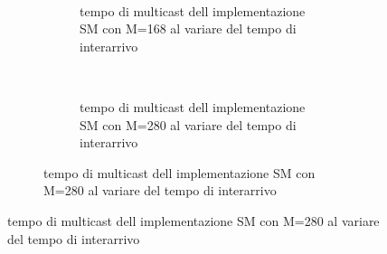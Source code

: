 \begin{figure}[p]
\begin{subfigure}[b]{.5\columnwidth}
\begin{subfigure}[b]{\textwidth}
    \end{subfigure}
    ~
    \begin{subfigure}[b]{\textwidth}
      \centering
      \addtocounter{subfigure}{-1}
      \renewcommand\thesubfigure{\alph{subfigure}2}
      \resizebox{\columnwidth}{!}{}
      \caption{tempo di multicast dell implementazione SM con M=168 al variare del tempo di interarrivo}
      \label{fig:scalability_SM_size168}
    \end{subfigure}
    ~
    \begin{subfigure}[b]{\textwidth}
      \centering
      \addtocounter{subfigure}{-1}
      \renewcommand\thesubfigure{\alph{subfigure}3}
      \resizebox{\columnwidth}{!}{}
      \caption{tempo di multicast dell implementazione SM con M=280 al variare del tempo di interarrivo}
      \label{fig:scalability_SM_size280}
    \end{subfigure}
    \label{fig:allscalability_SM}
  \end{subfigure}
\end{figure}


